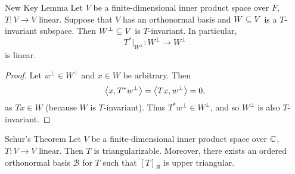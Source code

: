 \documentclass[class=article, crop=false]{standalone}
\begin{document}
  \begin{theorem}{New Key Lemma}
    Let $V$ be a finite-dimensional inner product space over $F$, $T\colon V\to V$ linear. Suppose that $V$ has an orthonormal basis and $W\subseteq V$ is a $T$-invariant subspace. Then $W^\perp\subseteq V$ is $T$-invariant. In particular,
    \[
      T^*|_{W^\perp}\colon W^\perp\to W^\perp
    \]
    is linear.
  \end{theorem}
  \begin{proof}
    Let $w^\perp\in W^\perp$ and $x\in W$ be arbitrary. Then
    \[
      \left\langle x, T^*w^\perp \right\rangle = \left\langle Tx, w^\perp \right\rangle = 0,
    \]
    as $Tx\in W$ (because $W$ is $T$-invariant). Thus $T^*w^\perp\in W^\perp$, and so $W^\perp$ is also $T$-invariant.
  \end{proof}
  \newpage
  \begin{theorem}{Schur's Theorem}
    Let $V$ be a finite-dimensional inner product space over $\mathbb{C}$, $T\colon V\to V$ linear. Then $T$ is triangularizable. Moreover, there exists an ordered orthonormal basis $\mathcal{B}$ for $T$ such that $[T]_{\mathcal{B}}$ is upper triangular.
  \end{theorem}
\end{document}

